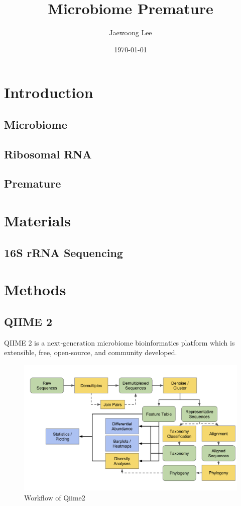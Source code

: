 \documentclass[11pt, a4paper]{article}
\title{Microbiome Premature}
\author{Jaewoong Lee}
\date{\today}
\begin{document}
   	\maketitle
    \newpage

    \tableofcontents
    \listoftables
    \listoffigures
    \newpage

    \section{Introduction}
        \subsection{Microbiome}

        \subsection[rRNA]{Ribosomal RNA}

        \subsection{Premature}

    \section{Materials}
        \subsection{16S rRNA Sequencing}

    \section{Methods}
        \subsection{QIIME 2}
            QIIME 2 is a next-generation microbiome bioinformatics platform which is extensible, free, open-source, and community developed.

            \begin{figure}[htbp]
                \centering
                \includegraphics[width=0.6 \linewidth]{figures/qiime.png}
                \caption{Workflow of Qiime2}
                \label{fig:qiime2}
            \end{figure}
\end{document}
